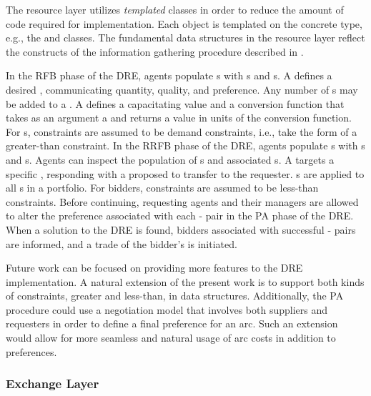 The resource layer utilizes \textit{templated} classes in order to reduce the
amount of code required for implementation. Each object is templated on the
concrete  type, e.g., the  and 
classes. The fundamental data structures in the resource layer reflect the
constructs of the information gathering procedure described in 
.

In the RFB phase of the DRE, agents populate s with
s and s. A 
defines a desired , communicating quantity, quality, and
preference. Any number of s may be added to a
. A  defines a
capacitating value and a conversion function that takes as an argument a
 and returns a value in units of the conversion function. For
s, constraints are assumed to be demand
constraints, i.e., take the form of a greater-than constraint. In the RRFB phase
of the DRE, agents populate s with s and
s. Agents can inspect the population of
s and associated s. A  targets a
specific , responding with a proposed  to
transfer to the requester. s are applied to all
s in a portfolio. For bidders, constraints are assumed to be
less-than constraints. Before continuing, requesting agents and their managers
are allowed to alter the preference associated with each
- pair in the PA phase of the DRE. When a solution
to the DRE is found, bidders associated with successful
- pairs are informed, and a trade of the bidder's
 is initiated.

Future work can be focused on providing more features to the DRE
implementation. A natural extension of the present work is to support both kinds
of constraints, greater and less-than, in  data
structures. Additionally, the PA procedure could use a negotiation model that
involves both suppliers and requesters in order to define a final preference for
an arc. Such an extension would allow for more seamless and natural usage of arc
costs in addition to preferences.

\subsubsection{Exchange Layer} 

